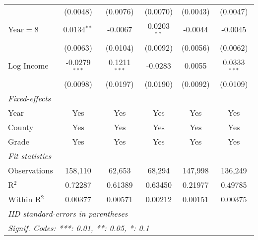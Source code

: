 \begin{table}[htbp]
\begin{tabular}{lccccc}
                           & (0.0048)        & (0.0076)        & (0.0070)       & (0.0043)        & (0.0047)\\
      Year$=$8             & 0.0134$^{**}$   & -0.0067         & 0.0203$^{**}$  & -0.0044         & -0.0045\\
                           & (0.0063)        & (0.0104)        & (0.0092)       & (0.0056)        & (0.0062)\\
      Log Income           & -0.0279$^{***}$ & 0.1211$^{***}$  & -0.0283        & 0.0055          & 0.0333$^{***}$\\
                           & (0.0098)        & (0.0197)        & (0.0190)       & (0.0092)        & (0.0109)\\
      \midrule \emph{Fixed-effects} &   &   &   &   &  \\
      Year                 & Yes             & Yes             & Yes            & Yes             & Yes\\
      County               & Yes             & Yes             & Yes            & Yes             & Yes\\
      Grade                & Yes             & Yes             & Yes            & Yes             & Yes\\
      \midrule \emph{Fit statistics} &   &   &   &   &  \\
      Observations         & 158,110         & 62,653          & 68,294         & 147,998         & 136,249\\
      R$^2$                & 0.72287         & 0.61389         & 0.63450        & 0.21977         & 0.49785\\
      Within R$^2$         & 0.00377         & 0.00571         & 0.00212        & 0.00151         & 0.00375\\
      \midrule\midrule\multicolumn{6}{l}{\emph{IID standard-errors in parentheses}}\\
      \multicolumn{6}{l}{\emph{Signif. Codes: ***: 0.01, **: 0.05, *: 0.1}}\\
   \end{tabular}
\end{table}


